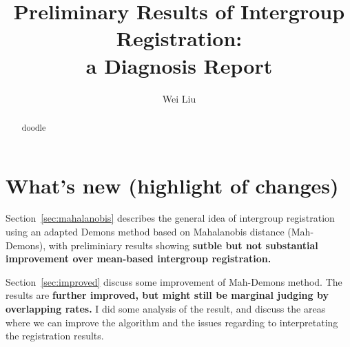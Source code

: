 \documentclass[preprint,review,12pt]{elsarticle}
\begin{document}


\begin{frontmatter}



\title{Preliminary Results of Intergroup Registration: \\ a Diagnosis Report}

\author{Wei Liu}
\address{
}

\begin{abstract}
doodle
\end{abstract}

\begin{keyword}


\end{keyword}

\end{frontmatter}



\section*{What's new (highlight of changes)}
Section~\ref{sec:mahalanobis} describes the general idea of intergroup registration using an adapted Demons method based on Mahalanobis distance (Mah-Demons), with preliminiary results showing {\bf sutble but not substantial improvement over mean-based intergroup registration.}

Section~\ref{sec:improved} discuss some improvement of Mah-Demons method. The results are {\bf further improved, but might still be marginal judging by overlapping rates.} I did some analysis of the result, and discuss the areas where we can improve the algorithm and the issues regarding to interpretating the registration results.


\tableofcontents
\end{document}
